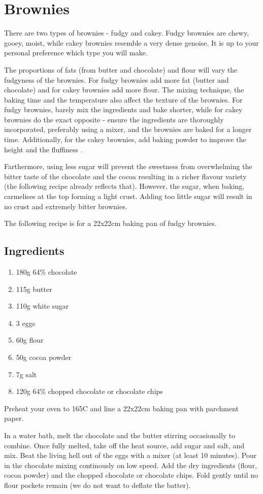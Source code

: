 \documentclass[11pt]{report}
\begin{document}
\section{Brownies}
There are two types of brownies - fudgy and cakey. Fudgy brownies are chewy,
gooey, moist, while cakey brownies resemble a very dense genoise. It is up to
your personal preference which type you will make.

The proportions of fats (from butter and chocolate) and flour will vary the
fudgyness of the brownies. For fudgy brownies add more fat (butter and
chocolate) and for cakey brownies add more flour. The mixing technique, the
baking time and the temperature also affect the texture of the brownies. For
fudgy brownies, barely mix the ingredients and bake shorter, while for cakey
brownies do the exact opposite - ensure the ingredients are thoroughly
incorporated, preferably using a mixer, and the brownies are baked for a longer
time. Additionally, for the cakey brownies, add baking powder to improve the
height and the fluffiness .

Farthermore, using less sugar will prevent the sweetness from overwhelming the
bitter taste of the chocolate and the cocoa resulting in a richer flavour
variety (the following recipe already reflects that). However, the sugar, when
baking, carmelises at the top forming a light crust. Adding too little sugar
will result in no crust and extremely bitter brownies.

The following recipe is for a 22x22cm baking pan of fudgy brownies.

\subsection*{Ingredients}
\begin{enumerate}
  \item 180g 64\% chocolate
  \item 115g butter
  \item 110g white sugar
  \item 3 eggs
  \item 60g flour
  \item 50g cocoa powder
  \item 7g salt
  \item 120g 64\% chopped chocolate or chocolate chips
\end{enumerate}

Preheat your oven to 165C and line a 22x22cm baking pan with parchment paper.

In a water bath, melt the chocolate and the butter stirring occasionally to
combine. Once fully melted, take off the heat source, add sugar and salt, and
mix. Beat the living hell out of the eggs with a mixer (at least 10 minutes).
Pour in the chocolate mixing continously on low speed. Add the dry ingredients
(flour, cocoa powder) and the chopped chocolate or chocolate chips. Fold gently
until no flour pockets remain (we do not want to deflate the batter).
\end{document}
